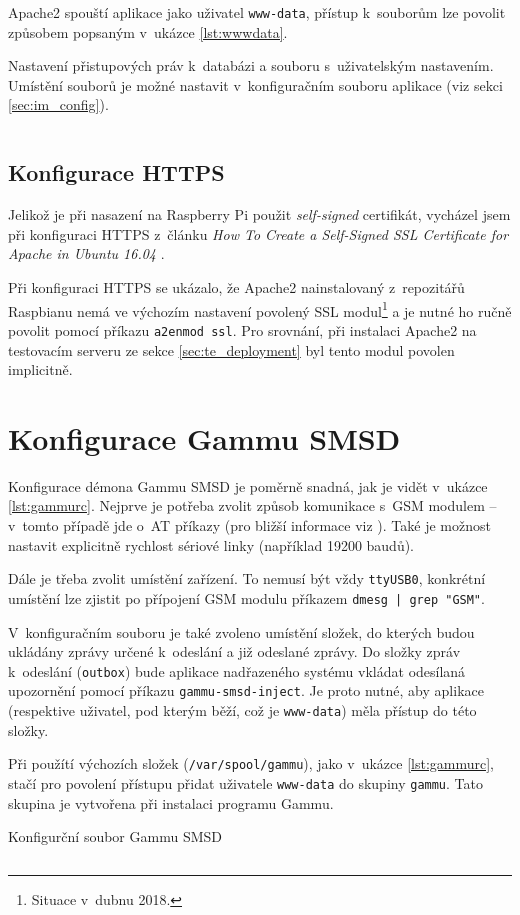 Apache2 spouští aplikace jako uživatel \texttt{www-data}, přístup k~souborům lze povolit způsobem popsaným v~ukázce \ref{lst:wwwdata}.

\begin{listing}[htbp]
\caption{\label{lst:wwwdata} Nastavení přistupových práv k~databázi a souboru s~uživatelským nastavením. Umístění souborů je možné nastavit v~konfiguračním souboru aplikace (viz sekci \ref{sec:im_config}).}
\inputminted[bgcolor=codebg]{bash}{source-samples/wwwdata.sh}
\end{listing}

\subsection{Konfigurace HTTPS}

Jelikož je při nasazení na Raspberry Pi použit \textit{self-signed} certifikát, vycházel jsem při konfiguraci HTTPS z~článku \textit{How To Create a Self-Signed SSL Certificate for Apache in Ubuntu 16.04} \cite{digital_ocean_selfsigned}.

Při konfiguraci HTTPS se ukázalo, že Apache2 nainstalovaný z~repozitářů Raspbianu nemá ve výchozím nastavení povolený SSL modul\footnote{Situace v~dubnu 2018.} a je nutné ho ručně povolit pomocí příkazu \texttt{a2enmod ssl}. Pro srovnání, při instalaci Apache2 na testovacím serveru ze sekce \ref{sec:te_deployment} byl tento modul povolen implicitně.

\section{Konfigurace Gammu SMSD}

Konfigurace démona Gammu SMSD je poměrně snadná, jak je vidět v~ukázce \ref{lst:gammurc}. Nejprve je potřeba zvolit způsob komunikace s~GSM modulem -- v~tomto případě jde o~AT příkazy (pro bližší informace viz \cite{gsm_standard}). Také je možnost nastavit explicitně rychlost sériové linky (například 19200 baudů).

Dále je třeba zvolit umístění zařízení. To nemusí být vždy \texttt{ttyUSB0}, konkrétní umístění lze zjistit po přípojení GSM modulu příkazem \texttt{dmesg | grep "GSM"}.

V~konfiguračním souboru je také zvoleno umístění složek, do kterých budou ukládány zprávy určené k~odeslání a již odeslané zprávy. Do složky zpráv k~odeslání (\texttt{outbox}) bude aplikace nadřazeného systému vkládat odesílaná upozornění pomocí příkazu \texttt{gammu-smsd-inject}. Je proto nutné, aby aplikace (respektive uživatel, pod kterým běží, což je \texttt{www-data}) měla přístup do této složky.

Při použítí výchozích složek (\texttt{/var/spool/gammu}), jako v~ukázce \ref{lst:gammurc}, stačí pro povolení přístupu přidat uživatele \texttt{www-data} do skupiny \texttt{gammu}. Tato skupina je vytvořena při instalaci programu Gammu.

\begin{listing}[htbp]
\caption{\label{lst:gammurc} Konfigurční soubor Gammu SMSD}
\inputminted[bgcolor=codebg]{ini}{source-samples/gammurc}
\end{listing}
